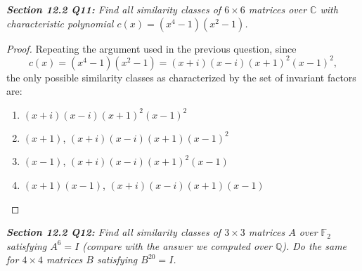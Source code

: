 \documentclass{article}
\begin{document}
\it \textbf{Section 12.2 Q11:} Find all similarity classes of $6\times6$
  matrices over $\mathbb{C}$ with characteristic polynomial
  $c(x)=(x^4-1)(x^2-1)$.

  \begin{proof}
    Repeating the argument used in the previous question, since
    \[c(x)=(x^4-1)(x^2-1)=(x+i)(x-i)(x+1)^2(x-1)^2,\]
    the only possible similarity classes as characterized by the set of
    invariant factors are:

    \begin{enumerate}
      \item $(x+i)(x-i)(x+1)^2(x-1)^2$
      \item $(x+1)$, $(x+i)(x-i)(x+1)(x-1)^2$
      \item $(x-1)$, $(x+i)(x-i)(x+1)^2(x-1)$
      \item $(x+1)(x-1)$, $(x+i)(x-i)(x+1)(x-1)$
    \end{enumerate}
  \end{proof}

\it \textbf{Section 12.2 Q12:} Find all similarity classes of $3\times3$
  matrices $A$ over $\mathbb{F}_2$ satisfying $A^6=I$ (compare with the
  answer we computed over $\mathbb{Q}$). Do the same for $4\times4$ matrices
  $B$ satisfying $B^{20}=I$.
\end{document}
